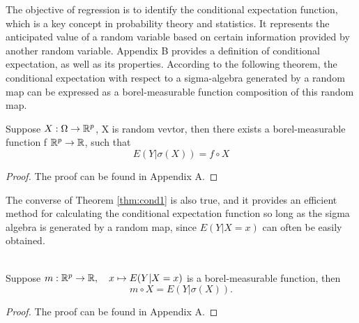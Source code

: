 The objective of regression is to identify the conditional expectation function, which is a key concept in probability theory and statistics. It represents the anticipated value of a random variable based on certain information provided by  another random variable. Appendix B provides a definition of conditional expectation, as well as its properties. According to the following theorem, the conditional expectation with respect to a sigma-algebra generated by a random map can be expressed as a borel-measurable function composition of this random map.
\begin{Theorem}\label{thm:cond1}
Suppose $X: \Omega \to \mathbb{R}^p$, X is random vevtor, then there exists a borel-measurable function f $\mathbb{R}^p \to \mathbb{R}$, such that
$$
E(Y|\sigma(X)) = f \circ X
$$
\end{Theorem}
\begin{proof}
The proof can be found in Appendix A.
\end{proof}
The converse of Theorem \ref{thm:cond1} is also true, and it provides an efficient method for calculating the conditional expectation function so long as the sigma algebra is generated by a random map, since $E(Y|X=x)$ can often be easily obtained.

\begin{Theorem} \label{thm:relationship} \ \\
Suppose $m: \mathbb{R}^p \to \mathbb{R}, \quad x \mapsto E(Y|X=x)$ is a borel-measurable function, then
\begin{equation}
m \circ X = E(Y|\sigma(X)).
\end{equation}
\end{Theorem}
\begin{proof}
The proof can be found in Appendix A.
\end{proof}


